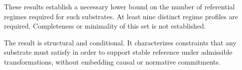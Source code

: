 These results establish a necessary lower bound on the number of
referential regimes required for such substrates.
At least nine distinct regime profiles are required.
Completeness or minimality of this set is not established.

The result is structural and conditional.
It characterizes constraints that any substrate must satisfy
in order to support stable reference under admissible transformations,
without embedding causal or normative commitments.






